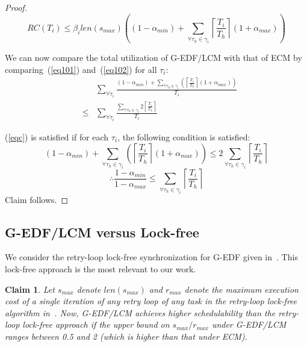 \documentclass[12pt,english]{report}
\newtheorem{clm}{Claim}
\newtheorem{proof}{Proof}
\begin{document}
\begin{proof}
\begin{equation}
RC(T_{i}) \le \beta_{i}len(s_{max}) \left((1-\alpha_{min}) + \sum_{\forall \tau_h \in \gamma_i}\left\lceil\frac{T_{i}}{T_{h}}\right\rceil(1+\alpha_{max})\right)
\label{eq102}\end{equation}

We can now compare the total utilization of G-EDF/LCM with that of ECM by comparing~(\ref{eq101}) and~(\ref{eq102}) for all $\tau_i$:
\begin{eqnarray}
& & \sum_{\forall \tau_{i}}\frac{(1-\alpha_{min})+\sum_{\forall \tau_{h}\in\gamma_{i}}\left(\left\lceil\frac{T_{i}}{T_{h}}\right\rceil(1+\alpha_{max})\right)}{T_{i}} \nonumber\\
& \le &   \sum_{\forall \tau_{i}}\frac{\sum_{\forall \tau_{h}\in\gamma_{i}}2\left\lceil\frac{T_{i}}{T_{h}}\right\rceil}{T_{i}}\label{eqc}\end{eqnarray}

(\ref{eqc}) is satisfied if for each $\tau_{i}$, the following condition is satisfied:
\begin{equation*}
(1-\alpha_{min})+\sum_{\forall \tau_h \in \gamma_i}\left(\left\lceil\frac{T_{i}}{T_{h}}\right\rceil(1+\alpha_{max})\right)  \le  2\sum_{\forall \tau_h \in \gamma_i}\left\lceil\frac{T_{i}}{T_{h}}\right\rceil
\end{equation*}
\begin{equation*}
\therefore\frac{1-\alpha_{min}}{1-\alpha_{max}}  \le  \sum_{\forall \tau_h \in \gamma_i}\left\lceil\frac{T_{i}}{T_{h}}\right\rceil
\end{equation*}
Claim follows.
\end{proof}


\subsection{G-EDF/LCM versus Lock-free}
\label{gedf-lcm-lock-free}
We consider the retry-loop lock-free synchronization for G-EDF given in~\cite{key-5}. This lock-free approach is the most relevant to our work. 

\begin{clm}\label{gedf-lcm-lock-free_clm} 
Let $s_{max}$ denote $len(s_{max})$ and $r_{max}$ denote the maximum execution cost of a single iteration of any retry loop of any task in the retry-loop lock-free algorithm in~\cite{key-5}. Now, G-EDF/LCM achieves higher schedulability than the retry-loop lock-free approach if the upper bound on $s_{max}/r_{max}$ under G-EDF/LCM ranges between 0.5 and 2 (which is higher than that under  ECM). 
\end{clm}
\end{document}
